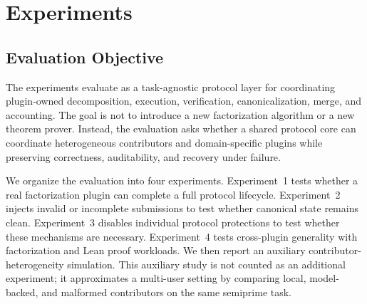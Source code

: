 \documentclass{article}
\theoremstyle{plain}
\begin{document}
\section{Experiments}
\label{sec:experiments}

\subsection{Evaluation Objective}
\label{subsec:evaluation-objective}

The experiments evaluate \TS{} as a task-agnostic protocol layer for coordinating
plugin-owned decomposition, execution, verification, canonicalization, merge, and
accounting. The goal is not to introduce a new factorization algorithm or a new
theorem prover. Instead, the evaluation asks whether a shared protocol core can
coordinate heterogeneous contributors and domain-specific plugins while
preserving correctness, auditability, and recovery under failure.

We organize the evaluation into four experiments. Experiment~1 tests whether a
real factorization plugin can complete a full protocol lifecycle. Experiment~2
injects invalid or incomplete submissions to test whether canonical state remains
clean. Experiment~3 disables individual protocol protections to test whether
these mechanisms are necessary. Experiment~4 tests cross-plugin generality with
factorization and Lean proof workloads. We then report an auxiliary
contributor-heterogeneity simulation. This auxiliary study is not counted as an
additional experiment; it approximates a multi-user setting by comparing local,
model-backed, and malformed contributors on the same semiprime task.
\end{document}
